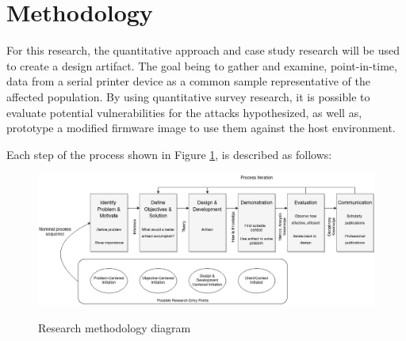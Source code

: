

\section{Methodology}  \label{methodology}

For this research, the quantitative approach and case study research will be used \autocite{babbie2017basics,creswell2017research} to create a design artifact. The goal being to gather and examine, point-in-time, data from a serial printer device as a common sample representative of the affected population. By using quantitative survey research, it is possible to evaluate potential vulnerabilities for the attacks hypothesized, as well as, prototype a modified firmware image to use them against the host environment.

Each step of the process shown in Figure \ref{fig:methodology_diagram}, is described as follows:

\begin{figure}[ht]
  \centering
  {\includegraphics[width=148mm,scale=0.8]
  {Figures/methodology_diagram_corrected.png}}
  \caption{Research methodology diagram \autocite{peffersDesignScienceResearch2007}}
  \label{fig:methodology_diagram}
\end{figure}

